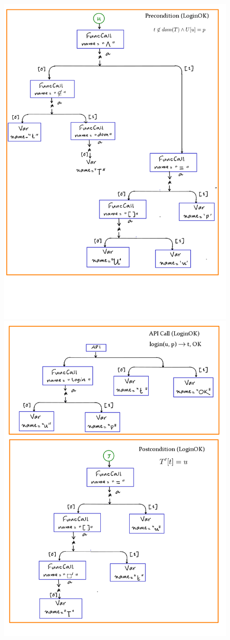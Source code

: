 \documentclass[12pts, a4paper]{article}
\begin{document}
\begin{center}
\includegraphics[width=0.9\textwidth]{../images/spec-AST-7.png}
\includegraphics[width=0.9\textwidth]{../images/spec-AST-8.png}
\end{center}
\end{document}
